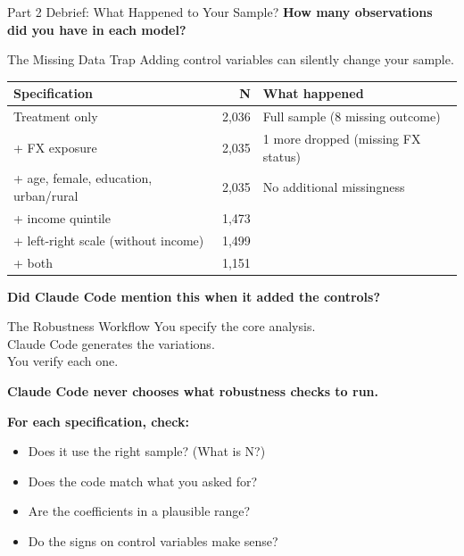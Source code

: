 \documentclass[aspectratio=169, 11pt]{beamer}
\begin{document}
\begin{frame}{Part 2 Debrief: What Happened to Your Sample?}
  \textbf{How many observations did you have in each model?}

  \vspace{1em}
  \pause
  \begin{alertblock}{The Missing Data Trap}
    Adding control variables can silently change your sample.
  \end{alertblock}

  \vspace{0.3em}
  \begin{tabular}{lrl}
    \toprule
    \textbf{Specification} & \textbf{N} & \textbf{What happened} \\
    \midrule
    Treatment only & 2,036 & Full sample (8 missing outcome) \\
    + FX exposure & 2,035 & 1 more dropped (missing FX status) \\
    + age, female, education, urban/rural & 2,035 & No additional missingness \\
    + income quintile & 1,473 & \color{red!70!black}{562 missing income} \\
    + left-right scale (without income) & 1,499 & \color{red!70!black}{536 missing left-right} \\
    + both & 1,151 & \color{red!70!black}{884 dropped: 43\% of the sample} \\
    \bottomrule
  \end{tabular}

  \vspace{0.5em}
  \textbf{Did Claude Code mention this when it added the controls?}
\end{frame}


\begin{frame}{The Robustness Workflow}
  \centering
  {\large You specify the core analysis.\\
  Claude Code generates the variations.\\
  You verify each one.}

  \vspace{1.5em}
  \textbf{Claude Code never chooses what robustness checks to run.}

  \vspace{1em}
  \textbf{For each specification, check:}
  \begin{itemize}
    \item Does it use the right sample? (What is N?)
    \item Does the code match what you asked for?
    \item Are the coefficients in a plausible range?
    \item Do the signs on control variables make sense?
  \end{itemize}

\end{frame}
\end{document}
